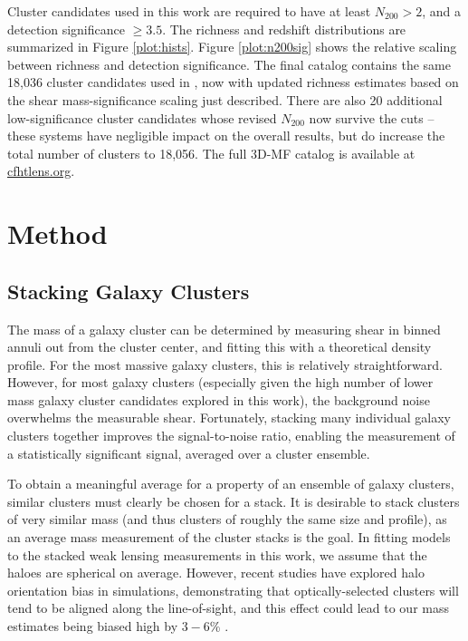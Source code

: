 Cluster candidates used in this work are required to have at least $N_{200} > 2$, and a detection significance $\ge 3.5$. The richness and redshift distributions are summarized in Figure \ref{plot:hists}. Figure \ref{plot:n200sig} shows the relative scaling between richness and detection significance. The final catalog contains the same 18,036 cluster candidates used in \citet{Ford14}, now with updated richness estimates based on the shear mass-significance scaling just described. There are also 20 additional low-significance cluster candidates whose revised $N_{200}$ now survive the cuts -- these systems have negligible impact on the overall results, but do increase the total number of clusters to 18,056. The full \ac{3D-MF} catalog is available at \url{cfhtlens.org}.  



\section{Method}
\label{method}

\subsection{Stacking Galaxy Clusters}

The mass of a galaxy cluster can be determined by measuring shear in binned annuli out from the cluster center, and fitting this with a theoretical density profile. For the most massive galaxy clusters, this is relatively straightforward. However, for most galaxy clusters (especially given the high number of lower mass galaxy cluster candidates explored in this work), the background noise overwhelms the measurable shear.  Fortunately, stacking many individual galaxy clusters together improves the signal-to-noise ratio, enabling the measurement of a statistically significant signal, averaged over a cluster ensemble.

To obtain a meaningful average for a property of an ensemble of galaxy clusters, similar clusters must clearly be chosen for a stack. It is desirable to stack clusters of very similar mass (and thus clusters of roughly the same size and profile), as an average mass measurement of the cluster stacks is the goal. In fitting models to the stacked weak lensing measurements in this work, we assume that the haloes are spherical on average. However, recent studies have explored halo orientation bias in simulations, demonstrating that optically-selected clusters will tend to be aligned along the line-of-sight, and this effect could lead to our mass estimates being biased high by $3-6$\% \citep{Dietrich14}.

